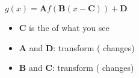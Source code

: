 \begin{tcolorbox}[center,colback=white,width=5in,]
    \centering
    $g(x) = \bm{A} f\left( \bm{B}(x-\bm{C})\right) + \bm{D}$
    \tcblower 
    \begin{itemize}[fullwidth]
        \item {$\bm{C}$ is the  of what you see}
        \item $\bm{A}$ and $\bm{D}$: transform  ( changes)
        \item $\bm{B}$ and $\bm{C}$: transform  ( changes)
    \end{itemize}
\end{tcolorbox}



